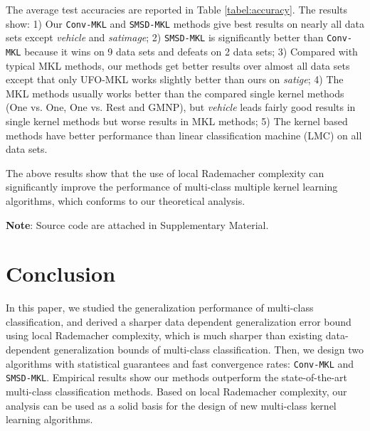 \documentclass{article}
\begin{document}
The average test accuracies are reported in Table \ref{tabel:accuracy}.
The results show: 1) Our \texttt{Conv-MKL} and \texttt{SMSD-MKL} methods give best results on nearly all data sets
except \textit{vehicle} and \textit{satimage};
2) \texttt{SMSD-MKL} is significantly better than \texttt{Conv-MKL} because it wins on 9 data sets and defeats on 2 data sets;
3) Compared with typical MKL methods,
our methods get better results over almost all data sets except that only UFO-MKL works slightly better than ours on \textit{satige};
4) The MKL methods usually works better than the compared single kernel methods (One vs. One, One vs. Rest and GMNP),
but \textit{vehicle} leads fairly good results in single kernel methods but worse results in MKL methods;
5) The kernel based methods have better performance than linear classification machine (LMC) on all data sets.

The above results show that the use of local Rademacher complexity can significantly improve
the performance of multi-class multiple kernel learning algorithms,
which conforms to our theoretical analysis. 

\textbf{Note}: Source code are attached in Supplementary Material.

\section{Conclusion}
In this paper, we studied the generalization performance of multi-class classification,
and derived a sharper data dependent generalization error bound using local Rademacher complexity,
which is much sharper than existing data-dependent generalization bounds of multi-class classification.
Then, we design two algorithms with statistical guarantees and fast convergence rates:
\texttt{Conv-MKL} and \texttt{SMSD-MKL}.
Empirical results show our methods outperform the state-of-the-art multi-class classification methods.
Based on local Rademacher complexity, our analysis can be used as a solid basis for the
design of new multi-class kernel learning algorithms.




\end{document}
